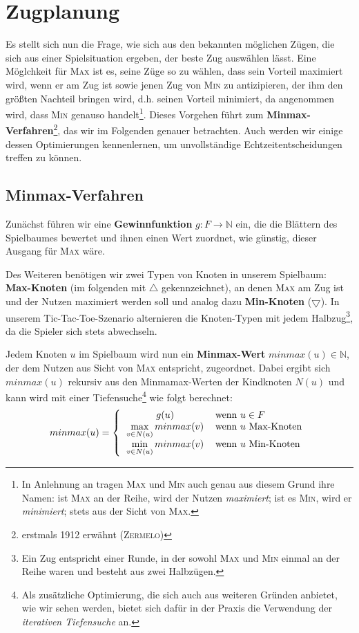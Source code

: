 \documentclass[a4paper,twoside]{scrartcl}
\begin{document}
\section{Zugplanung}

Es stellt sich nun die Frage, wie sich aus den bekannten möglichen Zügen, die sich aus einer Spielsituation ergeben, der beste Zug auswählen lässt. Eine Möglchkeit für \textsc{Max} ist es, seine Züge so zu wählen, dass sein Vorteil maximiert wird, wenn er am Zug ist sowie jenen Zug von \textsc{Min} zu antizipieren, der ihm den größten Nachteil bringen wird, d.h. seinen Vorteil minimiert, da angenommen wird, dass \textsc{Min} genauso handelt\footnote{In Anlehnung an \cite{R:2012} tragen \textsc{Max} und \textsc{Min} auch genau aus diesem Grund ihre Namen: ist \textsc{Max} an der Reihe, wird der Nutzen \textit{maximiert}; ist es \textsc{Min}, wird er \textit{minimiert}; stets aus der Sicht von \textsc{Max}.}. Dieses Vorgehen führt zum \textbf{Minmax-Verfahren}\footnote{erstmals 1912 erwähnt (\textsc{Zermelo})}, das wir im Folgenden genauer betrachten. Auch werden wir einige dessen Optimierungen kennenlernen, um unvollständige Echtzeitentscheidungen treffen zu können.


\subsection{Minmax-Verfahren}

Zunächst führen wir eine \textbf{Gewinnfunktion} $g: F \to \mathbb{N}$ ein, die die Blättern des Spielbaumes bewertet und ihnen einen Wert zuordnet, wie günstig, dieser Ausgang für \textsc{Max} wäre.

Des Weiteren benötigen wir zwei Typen von Knoten in unserem Spielbaum: \textbf{Max-Knoten} (im folgenden mit $\bigtriangleup$ gekennzeichnet), an denen \textsc{Max} am Zug ist und der Nutzen maximiert werden soll und analog dazu \textbf{Min-Knoten} ($\bigtriangledown$). In unserem Tic-Tac-Toe-Szenario alternieren die Knoten-Typen mit jedem Halbzug\footnote{Ein Zug entspricht einer Runde, in der sowohl \textsc{Max} und \textsc{Min} einmal an der Reihe waren und besteht aus zwei Halbzügen.}, da die Spieler sich stets abwechseln. 

Jedem Knoten $u$ im Spielbaum wird nun ein \textbf{Minmax-Wert} $minmax(u) \in \mathbb{N}$, der dem Nutzen aus Sicht von \textsc{Max} entspricht, zugeordnet. Dabei ergibt sich $minmax(u)$ rekursiv aus den Minmamax-Werten der Kindknoten $N(u)$ und kann wird mit einer Tiefensuche\footnote{Als zusätzliche Optimierung, die sich auch aus weiteren Gründen anbietet, wie wir sehen werden, bietet sich dafür in der Praxis die Verwendung der \textit{iterativen Tiefensuche} an.} wie folgt berechnet:
\[
  minmax(u) = \left\{
  \begin{tabular}{cl}
    $g(u)$ & wenn $u \in F$\\
    $\max\limits_{v \in N(u)} minmax(v)$ & wenn $u$ Max-Knoten\\
    $\min\limits_{v \in N(u)} minmax(v)$ & wenn $u$ Min-Knoten
  \end{tabular}\right.
\]
\end{document}
